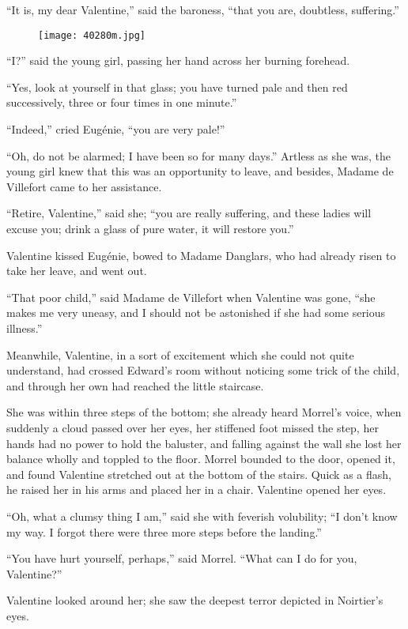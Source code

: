 “It is, my dear Valentine,” said the baroness, “that you are,
doubtless, suffering.”

\begin{figure}[ht]
\texttt{[image: 40280m.jpg]}
\end{figure}

“I?” said the young girl, passing her hand across her burning forehead.

“Yes, look at yourself in that glass; you have turned pale and then red
successively, three or four times in one minute.”

“Indeed,” cried Eugénie, “you are very pale!”

“Oh, do not be alarmed; I have been so for many days.” Artless as she
was, the young girl knew that this was an opportunity to leave, and
besides, Madame de Villefort came to her assistance.

“Retire, Valentine,” said she; “you are really suffering, and these
ladies will excuse you; drink a glass of pure water, it will restore
you.”

Valentine kissed Eugénie, bowed to Madame Danglars, who had already
risen to take her leave, and went out.

“That poor child,” said Madame de Villefort when Valentine was gone,
“she makes me very uneasy, and I should not be astonished if she had
some serious illness.”

Meanwhile, Valentine, in a sort of excitement which she could not quite
understand, had crossed Edward’s room without noticing some trick of
the child, and through her own had reached the little staircase.

She was within three steps of the bottom; she already heard Morrel’s
voice, when suddenly a cloud passed over her eyes, her stiffened foot
missed the step, her hands had no power to hold the baluster, and
falling against the wall she lost her balance wholly and toppled to the
floor. Morrel bounded to the door, opened it, and found Valentine
stretched out at the bottom of the stairs. Quick as a flash, he raised
her in his arms and placed her in a chair. Valentine opened her eyes.

“Oh, what a clumsy thing I am,” said she with feverish volubility; “I
don’t know my way. I forgot there were three more steps before the
landing.”

“You have hurt yourself, perhaps,” said Morrel. “What can I do for you,
Valentine?”

Valentine looked around her; she saw the deepest terror depicted in
Noirtier’s eyes.

